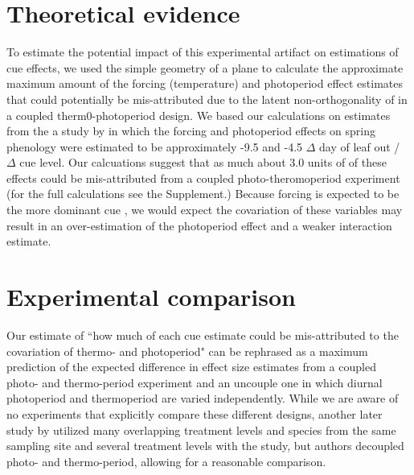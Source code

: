 \documentclass[11pt]{article}
\begin{document}
\section*{Theoretical evidence}
To estimate the potential impact of this experimental artifact on estimations of cue effects, we used the simple geometry of a plane to calculate the approximate maximum amount of the forcing (temperature) and photoperiod effect estimates that could potentially be mis-attributed due to the latent non-orthogonality of in a coupled therm0-photoperiod design. We based our calculations on estimates from the a study by \citet{} in which the forcing and photoperiod effects on spring phenology were estimated to be approximately -9.5 and -4.5  $\Delta$ day of leaf out / $\Delta$ cue level. Our calcuations suggest that as much about 3.0 units of of these effects could be mis-attributed from a coupled photo-theromoperiod experiment (for the full calculations see the Supplement.) Because forcing is expected to be the more dominant cue \citep{}, we would expect the covariation of these variables may result in an over-estimation of the photoperiod effect and a weaker interaction estimate. \\

\section*{Experimental comparison}
Our estimate of ``how much of each cue estimate could be mis-attributed to the covariation of thermo- and photoperiod" can be rephrased as a maximum prediction of the expected difference in effect size estimates from a coupled photo- and thermo-period experiment and an uncouple one in which diurnal photoperiod and thermoperiod are varied independently. While we are aware of no experiments that explicitly compare these different designs, another later study by \citet{Buonaiuto2020} utilized many overlapping treatment levels and species from the same sampling site and several treatment levels with the \citet{Flynn2018} study, but authors decoupled photo- and thermo-period,  allowing for a reasonable comparison.\\ 
\end{document}
